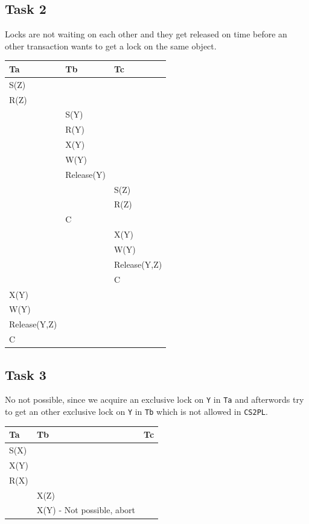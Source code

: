 \documentclass[12pt,a4paper]{article}
\begin{document}
\subsection{Task 2}
Locks are not waiting on each other and they get released on time before an other transaction wants to get a lock on the same object.
\begin{table}[!htbp]
    \centering
    \begin{tabularx}{\textwidth}{l|l|l}
        \hline
        Ta & Tb & Tc \\ 
        \hline
        S(Z) &  &  \\
        R(Z) &  &  \\      
             & S(Y) & \\
             & R(Y) & \\
             & X(Y) & \\             
             & W(Y) & \\
			 & Release(Y) & \\
             &  		& S(Z)\\             
        	 &  		& R(Z)\\      	 
       		& C 		& \\        	 
        	& 			& X(Y) \\       		
        	& 			& W(Y) \\
			& 			& Release(Y,Z) \\
        	& & C \\ 
		X(Y) & &  \\  
        W(Y) & &  \\ 
		Release(Y,Z) & &  \\ 
        C & &  \\   
        \hline
    \end{tabularx}
\end{table}

\newpage
\subsection{Task 3}
No not possible, since we acquire an exclusive lock on \texttt{Y} in \texttt{Ta} and afterwords try to get an other exclusive lock on \texttt{Y} in \texttt{Tb} which is not allowed in \texttt{CS2PL}.
\begin{table}[!htbp]
    \centering
    \begin{tabularx}{\textwidth}{l|l|l}
        \hline
        Ta & Tb & Tc \\ 
        \hline
        S(X) &  &  \\
        X(Y) &  &  \\
        R(X) &  &  \\
        	 & X(Z) &  \\
   			 & X(Y) - Not possible, abort &  \\          
        \hline
    \end{tabularx}
\end{table}
\end{document}
